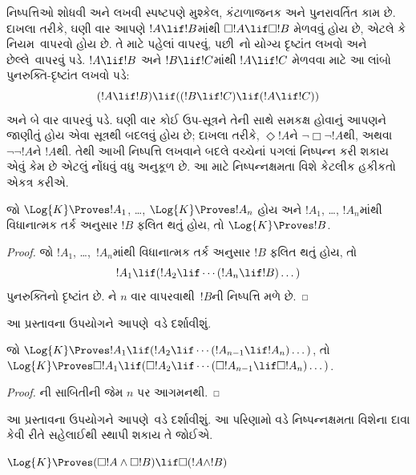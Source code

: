 \begingroup
\makeatletter{}\makeatother


\label{guunit:OLP-0432}


નિષ્પત્તિઓ શોધવી અને લખવી સ્પષ્ટપણે મુશ્કેલ, કંટાળાજનક અને
પુનરાવર્તિત કામ છે. દાખલા તરીકે, ઘણી વાર આપણે $!A \lif !B$માંથી
$\Box !A \lif \Box !B$ મેળવવું હોય છે, એટલે કે નિયમ~\RK વાપરવો હોય
છે. તે માટે પહેલાં \Nec વાપરવું, પછી~નો યોગ્ય દૃષ્ટાંત લખવો
અને છેલ્લે~\MP વાપરવું પડે. $!A \lif
!B$ અને $!B \lif !C$માંથી $!A \lif !C$ મેળવવા માટે આ લાંબો
પુનરુક્તિ-દૃષ્ટાંત લખવો પડે:
\[
(!A \lif !B) \lif ((!B \lif !C) \lif (!A \lif !C))
\]
અને \MP{} બે વાર વાપરવું પડે. ઘણી વાર કોઈ ઉપ-સૂત્રને તેની સાથે
સમકક્ષ હોવાનું આપણને જાણીતું હોય એવા સૂત્રથી બદલવું હોય છે; દાખલા
તરીકે, $\Diamond
  !A$ને $\lnot\Box\lnot !A$થી, અથવા
$\lnot\lnot !A$ને $!A$થી. તેથી આખી નિષ્પત્તિ લખવાને બદલે
વચ્ચેનાં પગલાં નિષ્પન્ન કરી શકાય એવું કેમ છે એટલું નોંધવું વધુ અનુકૂળ છે. આ માટે
નિષ્પન્નક્ષમતા વિશે કેટલીક હકીકતો એકત્ર કરીએ.

\begin{prop}
  જો $\Log{K} \Proves !A_1$, \dots, $\Log{K} \Proves !A_n$ હોય અને
  $!A_1$, \dots, $!A_n$માંથી વિધાનાત્મક તર્ક અનુસાર $!B$ ફલિત થતું હોય,
  તો $\Log{K} \Proves !B$.
\end{prop}

\begin{proof}
  જો $!A_1$, \dots,~$!A_n$માંથી વિધાનાત્મક તર્ક અનુસાર $!B$ ફલિત થતું હોય, તો
  \[
  !A_1 \lif (!A_2 \lif \cdots (!A_n \lif !B)\dots)
  \]
  પુનરુક્તિનો દૃષ્ટાંત છે. \MP{}ને $n$ વાર વાપરવાથી~$!B$ની
  નિષ્પત્તિ મળે છે.
\end{proof}

આ પ્રસ્તાવના ઉપયોગને આપણે~\PL વડે દર્શાવીશું.

\begin{prop}
  જો $\Log{K} \Proves !A_1 \lif (!A_2 \lif \cdots (!A_{n-1} \lif
  !A_n)\dots)$, તો $\Log{K} \Proves \Box !A_1 \lif (\Box !A_2 \lif
  \cdots (\Box !A_{n-1} \lif \Box !A_n)\dots)$.
\end{prop}

\begin{proof}
  ની સાબિતીની જેમ $n$ પર આગમનથી.
\end{proof}

આ પ્રસ્તાવના ઉપયોગને આપણે~\RK વડે દર્શાવીશું. આ પરિણામો વડે
નિષ્પન્નક્ષમતા વિશેના દાવા કેવી રીતે સહેલાઈથી સ્થાપી શકાય તે જોઈએ.

\begin{prop}
  $\Log{K} \Proves (\Box!A \land \Box!B) \lif \Box (!A \land !B)$
\end{prop}

